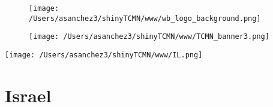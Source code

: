 \documentclass{article}\usepackage[]{graphicx}\usepackage[]{color}
\begin{document}
%

\begin{figure}
  \vspace{-3ex} %
  \hspace{-7ex} %
  \texttt{[image: /Users/asanchez3/shinyTCMN/www/wb\_logo\_background.png]}
\end{figure}
\begin{figure}
  \begin{minipage}[t]{0.99\textwidth} %
      \vspace{-30ex}
      \hspace{-2ex}
      \raggedright{\texttt{[image: /Users/asanchez3/shinyTCMN/www/TCMN\_banner3.png]}}
  \end{minipage}
\end{figure}
%
\begin{minipage}[t]{0.99\textwidth} %
  \vspace{-1.5cm}
  \begin{minipage}[c]{0.36\textwidth} 
    \begin{minipage}[c]{0.28\textwidth} %
      \texttt{[image: /Users/asanchez3/shinyTCMN/www/IL.png]}
    \end{minipage}
    \begin{minipage}[c]{0.70\textwidth} %
      \section*{\color{blue!40!black}Israel}
    \end{minipage}
  \end{minipage}
  \begin{minipage}[c]{0.63\textwidth}
    \begin{flushleft}  
    \end{flushleft} 
  \end{minipage}  
\end{minipage} %
\end{document}
